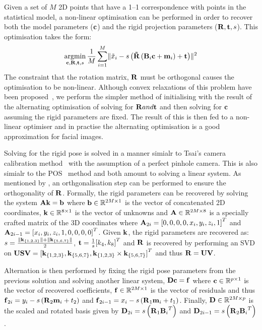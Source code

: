 Given a set of $M$ 2D points that have a 1--1 correspondence with points in the
statistical model, a non-linear optimisation can be performed in order to
recover both the model parameters ($\boldsymbol{\mathbf{c}}$) and the rigid projection parameters
($\boldsymbol{\mathbf{R}}, \boldsymbol{\mathbf{t}}, s$). This optimisation takes the form:
\begin{equation}
\argmin_{\bb{c}, \bb{R}, \bb{t}, s} \frac{1}{M} \sum_{i=1}^M \lVert \tilde{x}_i - s \left( \bb{\tilde{R}} \left(\bb{B}_i \bb{c} + \bb{m}_i\right) + \bb{t} \right) \rVert^2
\end{equation}
The constraint that the rotation matrix, $\boldsymbol{\mathbf{R}}$ must be orthogonal causes
the optimisation to be non-linear. Although convex relaxations of this problem
have been proposed~\cite{zhou20153d}, we perform the simpler method of
initialising with the result of the alternating optimisation of solving for
$\boldsymbol{\mathbf{R}} and \boldsymbol{\mathbf{t}}$ and then solving for $\boldsymbol{\mathbf{c}}$ assuming the rigid parameters
are fixed. The result of this is then fed to a non-linear optimiser and in practise
the alternating optimisation is a good approximation for facial images.

Solving for the rigid pose is solved in a manner simialr to Tsai's camera
calibration method~\cite{tsai1987versatile} with the assumption of a perfect
pinhole camera. This is also simialr to the POS~\cite{dementhon1995model}
method and both amount to solving a linear system. 
As mentioned by \citet{bas2016fitting}, an orthgonalisation step can be 
performed to ensure the orthogonality of $\boldsymbol{\mathbf{R}}$.
Formally, the rigid parameters can be recovered by solving the system
$\boldsymbol{\mathbf{A}}\boldsymbol{\mathbf{k}} = \boldsymbol{\mathbf{b}}$ where $\boldsymbol{\mathbf{b}} \in \mathbb{R}^{2M \times 1}$ is the vector
of concatenated 2D coordinates, $\boldsymbol{\mathbf{k}} \in \mathbb{R}^{8 \times 1}$ is the vector of
unknowns and $\boldsymbol{\mathbf{A}} \in \mathbb{R}^{2M \times 8}$ is a specially crafted matrix
of the 3D coordinates where $\boldsymbol{\mathbf{A}}_{2i} = {[0, 0, 0, 0, x_i, y_i, z_i, 1]}^T$ and
$\boldsymbol{\mathbf{A}}_{2i -1} = {[x_i, y_i, z_i, 1, 0, 0, 0, 0]}^T$. Given $\boldsymbol{\mathbf{k}}$, the rigid
parameters are recovered as:
$s = \frac{\lVert{} \boldsymbol{\mathbf{k}}_{\{1,2,3\}} \rVert + \lVert{} \boldsymbol{\mathbf{k}}_{\{5,6,7\}} \rVert}{2}$, $\boldsymbol{\mathbf{t}} = \frac{1}{s} {[k_4, k_8]}^T$
and $\boldsymbol{\mathbf{R}}$ is recovered by performing an SVD on
$\boldsymbol{\mathbf{U}}\boldsymbol{\mathbf{S}}\boldsymbol{\mathbf{V}} = {[\boldsymbol{\mathbf{k}}_{\{1,2,3\}}, \boldsymbol{\mathbf{k}}_{\{5,6,7\}}, \boldsymbol{\mathbf{k}}_{\{1,2,3\}} \times \boldsymbol{\mathbf{k}}_{\{5,6,7\}}]}^T$
and thus $\boldsymbol{\mathbf{R}} = \boldsymbol{\mathbf{U}}\boldsymbol{\mathbf{V}}$.

Alternation is then performed by fixing the rigid pose parameters from the previous
solution and solving another linear system, $\boldsymbol{\mathbf{D}}\boldsymbol{\mathbf{c}} = \boldsymbol{\mathbf{f}}$ where
$\boldsymbol{\mathbf{c}} \in \mathbb{R}^{p \times 1}$ is the vector of recovered coefficients,
$\boldsymbol{\mathbf{f}} \in \mathbb{R}^{2M \times 1}$ is the vector of residuals and thus
$\boldsymbol{\mathbf{f}}_{2i} = y_i - s \left(\boldsymbol{\mathbf{R}}_2 \boldsymbol{\mathbf{m}}_i + t_2 \right)$ and
$\boldsymbol{\mathbf{f}}_{2i - 1} = x_i - s \left(\boldsymbol{\mathbf{R}}_1 \boldsymbol{\mathbf{m}}_i + t_1 \right)$. Finally,
$\boldsymbol{\mathbf{D}} \in \mathbb{R}^{2M \times p}$ is the scaled and rotated basis given by
$\boldsymbol{\mathbf{D}}_{2i} = s \left( \boldsymbol{\mathbf{R}}_1 {\boldsymbol{\mathbf{B}}_i}^T \right)$ and 
$\boldsymbol{\mathbf{D}}_{2i - 1} = s \left( \boldsymbol{\mathbf{R}}_2 {\boldsymbol{\mathbf{B}}_i}^T \right)$.

